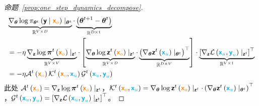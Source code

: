 \documentclass[citestyle=gb7714-2015, bibstyle=gb7714-2015,lang=cn,14pt,scheme=chinese]{elegantbook}
\begin{document}
\begin{proof}[命题~\ref{prop:one_step_dynamics_decompose}]
\begin{equation}
\begin{aligned}
    &\underbrace{\nabla_{\bm{\theta}} \log \pi_{\bm{\theta}^{t}} \left( \bm{\mathsf{y}} \mid \textcolor{orange}{\bm{\mathsf{x}}_{o}} \right) \mid_{\bm{\theta}^{t}}}_{\mathbb{R}^{V \times D}} \cdot \underbrace{\left( \bm{\theta}^{t+1} - \bm{\theta}^{t} \right)}_{\mathbb{R}^{D \times 1}} \\
    &= - \eta \underbrace{\nabla_{\bm{\mathsf{z}}} \log \bm{\pi}^{t} \left( \textcolor{orange}{\bm{\mathsf{x}}_{o}} \right) \mid_{\bm{\mathsf{z}}^{t}}}_{\mathbb{R}^{V \times V}} \cdot \left[ \underbrace{\nabla_{\bm{\theta}} \log \bm{\mathsf{z}}^{t} \left( \textcolor{orange}{\bm{\mathsf{x}}_{o}} \right) \mid_{\bm{\mathsf{z}}^{t}}}_{\mathbb{R}^{V \times D}} \cdot \underbrace{ \left( \nabla_{\bm{\theta}} \bm{\mathsf{z}}^{t} \left( \textcolor{cyan}{\bm{\mathsf{x}}_{u}} \right) \mid_{\bm{\theta}^{t}} \right)^{\top}}_{\mathbb{R}^{D \times V}} \right] \cdot \underbrace{ \left[ \nabla_{\bm{\mathsf{z}}} \mathcal{L} \left( \textcolor{cyan}{\bm{\mathsf{x}}_{u}}, \textcolor{cyan}{\bm{\mathsf{y}}_{u}} \right) \mid_{\bm{\mathsf{z}}^{t}} \right]^{\top}}_{\mathbb{R}^{V \times 1}} \\
    &= - \eta \mathcal{A}^{t} \left( \textcolor{orange}{\bm{\mathsf{x}}_{o}} \right) \mathcal{K}^{t} \left( \textcolor{orange}{\bm{\mathsf{x}}_{o}}, \textcolor{cyan}{\bm{\mathsf{x}}_{u}} \right) \mathcal{G}^{t} \left( \textcolor{cyan}{\bm{\mathsf{x}}_{u}}, \textcolor{cyan}{\bm{\mathsf{y}}_{u}} \right)
\end{aligned}
\end{equation}
此处 \( \mathcal{A}^{t} \left( \textcolor{orange}{\bm{\mathsf{x}}_{o}} \right) = \nabla_{\bm{\mathsf{z}}} \log \bm{\pi}^{t} \left( \textcolor{orange}{\bm{\mathsf{x}}_{o}} \right) \mid_{\bm{\mathsf{z}}^{t}} \)，\(\mathcal{K}^{t} \left( \textcolor{orange}{\bm{\mathsf{x}}_{o}}, \textcolor{cyan}{\bm{\mathsf{x}}_{u}} \right) = \nabla_{\bm{\theta}} \log \bm{\mathsf{z}}^{t} \left( \textcolor{orange}{\bm{\mathsf{x}}_{o}} \right) \mid_{\bm{\mathsf{z}}^{t}} \cdot \left( \nabla_{\bm{\theta}} \bm{\mathsf{z}}^{t} \left( \textcolor{cyan}{\bm{\mathsf{x}}_{u}} \right) \mid_{\bm{\theta}^{t}} \right)^{\top}\)，\(\mathcal{G}^{t} \left( \textcolor{cyan}{\bm{\mathsf{x}}_{u}}, \textcolor{cyan}{\bm{\mathsf{y}}_{u}} \right) = \left[ \nabla_{\bm{\mathsf{z}}} \mathcal{L} \left( \textcolor{cyan}{\bm{\mathsf{x}}_{u}}, \textcolor{cyan}{\bm{\mathsf{y}}_{u}} \right) \mid_{\bm{\mathsf{z}}^{t}} \right]^{\top}\)。


\end{proof}
\end{document}
